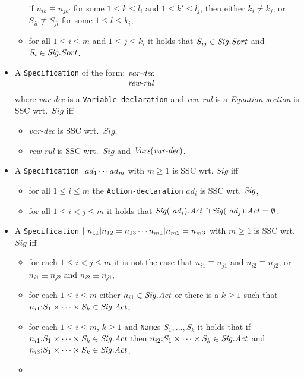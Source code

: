 \documentclass[twoside,fleqn,a4paper,dvips]{article}
\newcommand{\Sig}{\nm{Sig}}
\newcommand{\Vars}{\mbox{\em Vars}}
\begin{document}
\begin{defn}[\tt Specification]
\begin{itemize}
\begin{itemize}
if $n_{ik}\equiv n_{jk'}$ for some $1\leq k\leq l_i$ and $1\leq
k'\leq l_j$, then either $k_i\neq k_j$, or $S_{il}\not\equiv
S_{jl}$ for some $1\leq l\leq k_i$,
\item
for all $1\leq i\leq m$ and $1\leq j\leq k_i$ it holds that
$S_{ij}\in \Sig.Sort$ and $S_i\in \Sig.Sort$.
\end{itemize}
\item
A {\tt Specification} of the form:
$\begin{minipage}[t]{7cm}
{\it var-dec}\\
{\it rew-rul}\vspace{2ex}
\end{minipage}$\\
where {\it var-dec} is a {\tt Variable-declaration}
and {\it rew-rul} is a {\it Equation-section}
is SSC wrt.\ $Sig$ iff
\begin{itemize}
\item
{\it var-dec} is SSC wrt.\ $Sig$,
\item
{\it rew-rul} is SSC wrt.\ $Sig$ and $\Vars(\mbox{\it var-dec})$.
\end{itemize}
\item
A {\tt Specification} $\mathsf{~}ad_1\cdots ad_m$
with $m\geq 1$ is SSC wrt. $Sig$ iff
\begin{itemize}
\item for all $1\leq i\leq m$ the {\tt Action-declaration}
$ad_i$ is SSC wrt.  $\Sig$,
\item for all $1\leq i<j\leq m$ it holds that
$\Sig(\act~ad_i).\Act\cap \Sig(\act~ad_j).\Act=\emptyset$.
\end{itemize}
\item
A {\tt Specification}
$\mathbin{\mid}~n_{11}| n_{12}= n_{13}\cdots n_{m1}|
n_{m2}= n_{m3}$ with $m\geq 1$ is SSC wrt.\ $Sig$ iff
\begin{itemize}
\item
for each $1\leq i<j\leq m$ it is not the case that $n_{i1}\equiv n_{j1}$
and $n_{i2}\equiv n_{j2}$, or $n_{i1}\equiv n_{j2}$ and $n_{i2}\equiv
n_{j1}$,
\item
for each $1\leq i\leq m$ either $n_{i1}\in \Sig.\Act$ or there is a 
$k\geq 1$ such that $n_{i1}\ap S_1\times \cdots \times S_k\in \Sig.\Act$,
\item
for each $1\leq i\leq m$, $k\geq 1$ and {\tt Name}s $S_1,\ldots,S_k$ it
holds
that if $n_{i1}\ap S_1\times\cdots\times S_k\in \Sig.\Act$ then
$n_{i2}\ap S_1\times\cdots\times
S_k\in \Sig.\Act$ and $n_{i3}\ap S_1\times\cdots\times S_k\in \Sig.\Act$,
\item

\end{itemize}
\end{itemize}
\end{defn}
\end{document}
